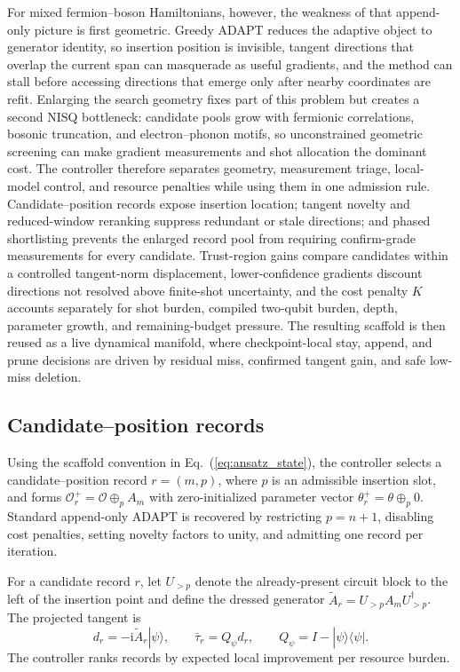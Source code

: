 \documentclass[
  reprint,
  amsmath,
  amssymb,
  aps,
  pra,
  nofootinbib,
  superscriptaddress,
  floatfix
]{revtex4-2}
\newcommand{\Oset}{\mathcal{O}}
\newcommand{\ii}{\mathrm{i}}
\newcommand{\ket}[1]{|#1\rangle}
\newcommand{\bra}[1]{\langle #1|}
\begin{document}
For mixed fermion--boson Hamiltonians, however, the weakness of that append-only picture is first geometric. Greedy ADAPT reduces the adaptive object to generator identity, so insertion position is invisible, tangent directions that overlap the current span can masquerade as useful gradients, and the method can stall before accessing directions that emerge only after nearby coordinates are refit. Enlarging the search geometry fixes part of this problem but creates a second NISQ bottleneck: candidate pools grow with fermionic correlations, bosonic truncation, and electron--phonon motifs, so unconstrained geometric screening can make gradient measurements and shot allocation the dominant cost. The controller therefore separates geometry, measurement triage, local-model control, and resource penalties while using them in one admission rule. Candidate--position records expose insertion location; tangent novelty and reduced-window reranking suppress redundant or stale directions; and phased shortlisting prevents the enlarged record pool from requiring confirm-grade measurements for every candidate. Trust-region gains compare candidates within a controlled tangent-norm displacement, lower-confidence gradients discount directions not resolved above finite-shot uncertainty, and the cost penalty $K$ accounts separately for shot burden, compiled two-qubit burden, depth, parameter growth, and remaining-budget pressure. The resulting scaffold is then reused as a live dynamical manifold, where checkpoint-local stay, append, and prune decisions are driven by residual miss, confirmed tangent gain, and safe low-miss deletion.

\subsection{Candidate--position records}

Using the scaffold convention in Eq.~(\ref{eq:ansatz_state}), the controller selects a candidate--position record $r=(m,p)$, where $p$ is an admissible insertion slot, and forms $\Oset_r^+=\Oset\oplus_p A_m$ with zero-initialized parameter vector $\theta_r^+=\theta\oplus_p0$. Standard append-only ADAPT is recovered by restricting $p=n+1$, disabling cost penalties, setting novelty factors to unity, and admitting one record per iteration.

For a candidate record $r$, let $U_{>p}$ denote the already-present circuit block to the left of the insertion point and define the dressed generator $\widetilde A_r=U_{>p}A_mU_{>p}^{\dagger}$. The projected tangent is
\begin{equation}
d_r=-\ii \widetilde A_r\ket{\psi},
\qquad
\bar\tau_r=Q_{\psi}d_r,
\qquad
Q_{\psi}=I-\ket{\psi}\bra{\psi}.
\label{eq:record_tangent}
\end{equation}
The controller ranks records by expected local improvement per resource burden.
\end{document}
